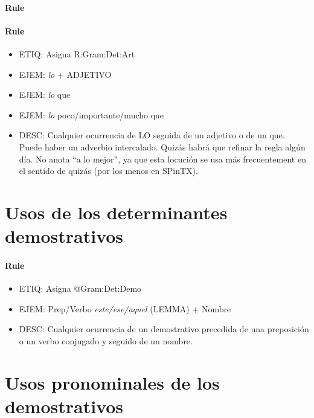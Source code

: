 \documentclass[11pt]{report}
\begin{document}
\paragraph*{Rule}
\paragraph*{Rule}
\begin{itemize}
\item ETIQ: Asigna R:Gram:Det:Art
\item EJEM: \emph{lo} + ADJETIVO 
\item EJEM: \emph{lo} que 
\item EJEM: \emph{lo} poco/importante/mucho que 
\item DESC: Cualquier ocurrencia de LO seguida de un adjetivo o de un que. Puede haber un adverbio intercalado. Quizás habrá que refinar la regla algún día. No anota ``a lo mejor'', ya que esta locución se usa más frecuentement en el sentido de quizás (por los menos en SPinTX).
\end{itemize}

\section{Usos de los determinantes demostrativos}
\paragraph*{Rule}
\begin{itemize}
\item ETIQ: Asigna @Gram:Det:Demo
\item EJEM: Prep/Verbo \emph{este/ese/aquel} (LEMMA) + Nombre
\item DESC: Cualquier ocurrencia de un demostrativo precedida de una preposición o un verbo conjugado y seguido de un nombre.
\end{itemize}

\section{Usos pronominales de los demostrativos}
\end{document}
